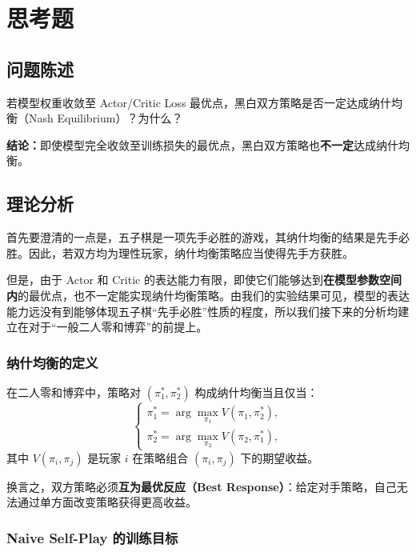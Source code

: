 \documentclass[oneside]{ctexbook}
\begin{document}
\chapter{思考题} \label{chap:questions}

\section{问题陈述}

若模型权重收敛至 Actor/Critic Loss 最优点，黑白双方策略是否一定达成纳什均衡（Nash Equilibrium）？为什么？

\textbf{结论：}即使模型完全收敛至训练损失的最优点，黑白双方策略也\textbf{不一定}达成纳什均衡。

\section{理论分析}

首先要澄清的一点是，五子棋是一项先手必胜的游戏，其纳什均衡的结果是先手必胜。因此，若双方均为理性玩家，纳什均衡策略应当使得先手方获胜。

但是，由于 Actor 和 Critic 的表达能力有限，即使它们能够达到\textbf{在模型参数空间内}的最优点，也不一定能实现纳什均衡策略。由我们的实验结果可见，模型的表达能力远没有到能够体现五子棋“先手必胜”性质的程度，所以我们接下来的分析均建立在对于“一般二人零和博弈”的前提上。

\subsection{纳什均衡的定义}

在二人零和博弈中，策略对 $(\pi_1^*, \pi_2^*)$ 构成纳什均衡当且仅当：
\begin{equation}
\begin{cases}
\pi_1^* = \arg\max_{\pi_1} V(\pi_1, \pi_2^*), \\
\pi_2^* = \arg\max_{\pi_2} V(\pi_2, \pi_1^*),
\end{cases}
\end{equation}
其中 $V(\pi_i, \pi_j)$ 是玩家 $i$ 在策略组合 $(\pi_i, \pi_j)$ 下的期望收益。

换言之，双方策略必须\textbf{互为最优反应（Best Response）}：给定对手策略，自己无法通过单方面改变策略获得更高收益。

\subsection{Naive Self-Play 的训练目标}
\end{document}
